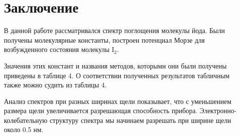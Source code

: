 \section{Заключение}
В данной работе рассматривался спектр поглощения молекулы йода. Были получены молекулярные константы, построен потенциал Морзе для возбужденного состояния молекулы $\text{I}_2$.

Значения этих констант и названия методов, которыми они были получены приведены в таблице 4.
О соответствии полученных результатов табличным также можно судить из таблицы 4.

Анализ спектров при разных ширинах щели показывает, что с уменьшением размера щели увеличивается разрешающая способность прибора. Электронно-колебательную структуру спектра мы начинаем разрешать при ширине щели около 0.5 нм.

